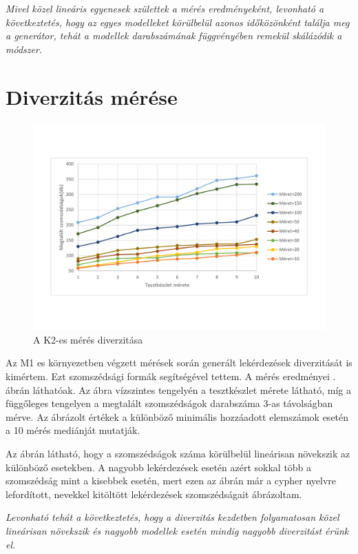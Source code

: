 \textit{Mivel közel lineáris egyenesek születtek a mérés eredményeként, levonható a következtetés, hogy az egyes modelleket körülbelül azonos időközönként találja meg a generátor,  tehát a modellek darabszámának függvényében remekül skálázódik a módszer.}

\section{Diverzitás mérése}


\begin{figure}
	\centering
	\includegraphics[width=1\textwidth]{figures/diversityB}
	\caption{A K2-es mérés diverzitása}
	\label{fig:BDiversity}
\end{figure}

Az M1 es környezetben végzett mérések során generált lekérdezések diverzitását is kimértem. Ezt szomszédsági formák segítségével tettem. A mérés eredményei . ábrán láthatóak. Az ábra vízszintes tengelyén a tesztkészlet mérete látható, míg a függőleges tengelyen a megtalált szomszédságok darabszáma 3-as távolságban mérve. Az ábrázolt értékek a különböző minimális hozzáadott elemszámok esetén a 10 mérés mediánját mutatják.

Az ábrán látható, hogy a szomszédságok száma körülbelül lineárisan növekszik az különböző esetekben. A nagyobb lekérdezések esetén azért sokkal több a szomszédság mint a kisebbek esetén, mert ezen az ábrán már a cypher nyelvre lefordított, nevekkel kitöltött lekérdezések szomszédságait ábrázoltam.

\textit{Levonható tehát a következtetés, hogy a diverzitás kezdetben folyamatosan közel lineárisan növekszik és nagyobb modellek esetén mindig nagyobb diverzitást érünk el.}  

